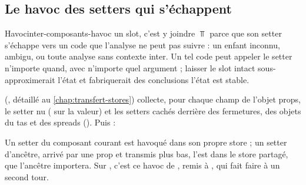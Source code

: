 \subsection{Le havoc des setters qui s'échappent}

\begin{definition}{Havoc}{inter-composants-havoc}
 un slot, c'est y joindre $\Top$ parce que son setter s'échappe vers un
code que l'analyse ne peut pas suivre : un enfant inconnu, ambigu, ou toute analyse sans
contexte inter. Un tel code peut appeler le setter n'importe quand, avec n'importe quel
argument ; laisser le slot intact sous-approximerait l'état et fabriquerait des conclusions
\og l'état est stable\fg.
\end{definition}

 (, détaillé au
\cref{chap:transfert-stores}) collecte, pour chaque champ de l'objet props, le setter nu
( sur la valeur) et les setters cachés derrière des fermetures, des objets du
tas et des spreads (). Puis :


Un setter du composant courant est havoqué dans son propre store ; un setter d'ancêtre, arrivé
par une prop et transmis plus bas, l'est dans le store partagé, que l'ancêtre importera.
Sur , c'est ce havoc de , remis à , qui fait faire
à  un second tour.

